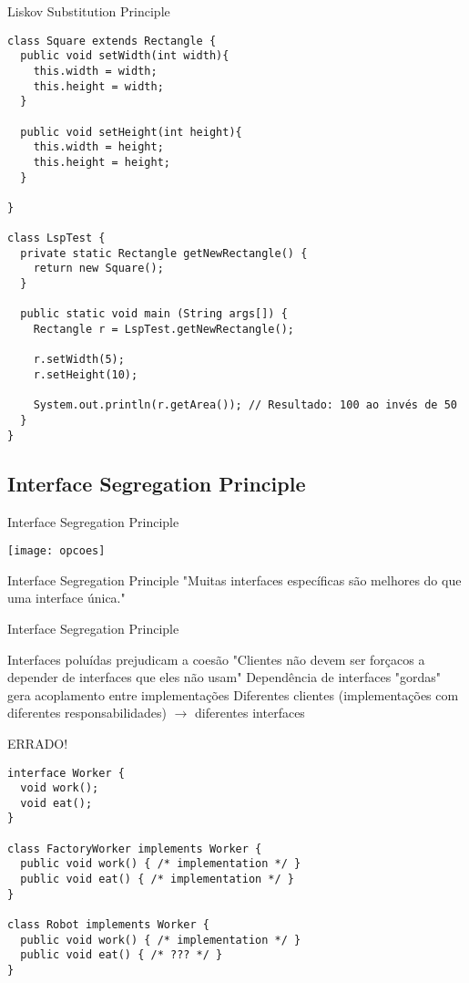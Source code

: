 \documentclass{beamer}
\begin{document}
\begin{frame}[fragile]{Liskov Substitution Principle}
 \begin{verbatim}
class Square extends Rectangle {
  public void setWidth(int width){
    this.width = width;
    this.height = width;
  }

  public void setHeight(int height){
    this.width = height;
    this.height = height;
  }

}

class LspTest {
  private static Rectangle getNewRectangle() {
    return new Square();
  }

  public static void main (String args[]) {
    Rectangle r = LspTest.getNewRectangle();
        
    r.setWidth(5);
    r.setHeight(10);
    
    System.out.println(r.getArea()); // Resultado: 100 ao invés de 50
  }
}
  \end{verbatim}
\end{frame}

\subsection{Interface Segregation Principle}

\begin{frame}{Interface Segregation Principle}
  \begin{center}
    \texttt{[image: opcoes]}
  \end{center}
\end{frame}

\begin{frame}{Interface Segregation Principle}
 "Muitas interfaces específicas são melhores do que uma interface única."
\end{frame}

\begin{frame}{Interface Segregation Principle}
 \begin{outline}
   Interfaces poluídas prejudicam a coesão
   "Clientes não devem ser forçacos a depender de interfaces que eles não usam"
     Dependência de interfaces "gordas" gera acoplamento entre implementações
   Diferentes clientes (implementações com diferentes responsabilidades) $\rightarrow$ diferentes interfaces
 \end{outline}
\end{frame}

\begin{frame}[fragile]{ERRADO!}
 \begin{verbatim}
interface Worker {
  void work();
  void eat();
}

class FactoryWorker implements Worker {
  public void work() { /* implementation */ }
  public void eat() { /* implementation */ }
}

class Robot implements Worker {
  public void work() { /* implementation */ }
  public void eat() { /* ??? */ }
}
  \end{verbatim}
\end{frame}
\end{document}
